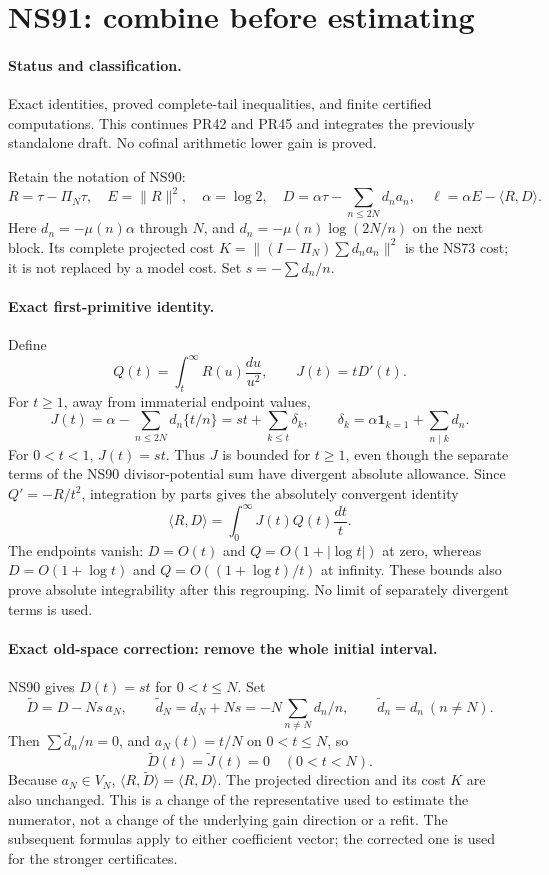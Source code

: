 \section*{NS91: combine before estimating}

\paragraph{Status and classification.}
Exact identities, proved complete-tail inequalities, and finite certified computations.
This continues PR42 and PR45 and integrates the previously standalone draft.
No cofinal arithmetic lower gain is proved.

Retain the notation of NS90:
\[
 R=\tau-\Pi_N\tau,\quad E=\|R\|^2,\quad
 \alpha=\log2,\quad D=\alpha\tau-\sum_{n\le2N}d_na_n,
 \quad \ell=\alpha E-\langle R,D\rangle.
\]
Here $d_n=-\mu(n)\alpha$ through $N$, and
$d_n=-\mu(n)\log(2N/n)$ on the next block. Its complete projected cost
$K=\|(I-\Pi_N)\sum d_na_n\|^2$ is the NS73 cost; it is not replaced
by a model cost. Set $s=-\sum d_n/n$.

\paragraph{Exact first-primitive identity.}
Define
\[
 Q(t)=\int_t^\infty R(u)\frac{du}{u^2},\qquad J(t)=tD'(t).
\]
For $t\ge1$, away from immaterial endpoint values,
\[
 J(t)=\alpha-\sum_{n\le2N}d_n\{t/n\}
     =st+\sum_{k\le t}\delta_k,
 \qquad \delta_k=\alpha\mathbf1_{k=1}+\sum_{n\mid k}d_n.
\]
For $0<t<1$, $J(t)=st$.
Thus $J$ is bounded for $t\ge1$, even though the separate terms of the
NS90 divisor-potential sum have divergent absolute allowance. Since
$Q'=-R/t^2$, integration by parts gives the absolutely convergent identity
\begin{equation}\label{ns91-first}
 \langle R,D\rangle=\int_0^\infty J(t)Q(t)\frac{dt}{t}.
\end{equation}
The endpoints vanish: $D=O(t)$ and $Q=O(1+|\log t|)$ at zero, whereas
$D=O(1+\log t)$ and $Q=O((1+\log t)/t)$ at infinity. These bounds also
prove absolute integrability after this regrouping. No limit of separately
divergent terms is used.

\paragraph{Exact old-space correction: remove the whole initial interval.}
NS90 gives $D(t)=st$ for $0<t\le N$. Set
\[
 \widetilde D=D-Ns\,a_N,\qquad
 \widetilde d_N=d_N+Ns=-N\sum_{n\ne N}d_n/n,
 \qquad \widetilde d_n=d_n\ (n\ne N).
\]
Then $\sum\widetilde d_n/n=0$, and $a_N(t)=t/N$ on $0<t\le N$, so
\begin{equation}\label{ns91-zero-initial}
 \widetilde D(t)=\widetilde J(t)=0\quad(0<t<N).
\end{equation}
Because $a_N\in V_N$, $\langle R,\widetilde D\rangle=\langle R,D\rangle$.
The projected direction and its cost $K$ are also unchanged. This is a
change of the representative used to estimate the numerator, not a change
of the underlying gain direction or a refit. The subsequent formulas
apply to either coefficient vector; the corrected one is used for the
stronger certificates.

